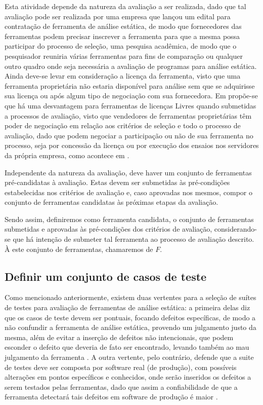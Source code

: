 Esta atividade depende da natureza da avaliação a ser realizada, dado que tal avaliação pode ser realizada por uma empresa que lançou um edital para contratação de ferramenta de análise estática, de modo que fornecedores das ferramentas podem precisar inscrever a ferramenta para que a mesma possa participar do processo de seleção, uma pesquisa acadêmica, de modo que o pesquisador reuniria várias ferramentas para fins de comparação ou qualquer outro quadro onde seja necessária a avaliação de programas para análise estática. Ainda deve-se levar em consideração a licença da ferramenta, visto que uma ferramenta proprietária não estaria disponível para análise sem que se adquirisse sua licença ou após algum tipo de negociação com sua fornecedora. Em \cite{pascal} propõe-se que há uma desvantagem para ferramentas de licenças Livres quando submetidas a processos de avaliação, visto que vendedores de ferramentas proprietárias têm poder de negociação em relação aos critérios de seleção e todo o processo de avaliação, dado que podem negociar a participação ou não de sua ferramenta no processo, seja por concessão da licença ou por execução dos ensaios nos servidores da própria empresa, como acontece em \cite{sate_iv}.

Independente da natureza da avaliação, deve haver um conjunto de ferramentas pré-candidatas à avaliação. Estas devem ser submetidas às pré-condições estabelecidas nos critérios de avaliação e, caso aprovadas nos mesmos, compor o conjunto de ferramentas candidatas às próximas etapas da avaliação.

Sendo assim, definiremos como ferramenta candidata, o conjunto de ferramentas submetidas e aprovadas às pré-condições dos critérios de avaliação, considerando-se que há intenção de submeter tal ferramenta ao processo de avaliação descrito. À este conjunto de ferramentas, chamaremos de $F$.

\subsection{Definir um conjunto de casos de teste}

Como mencionado anteriormente, existem duas vertentes para a seleção de suítes de testes para avaliação de ferramentas de análise estática: a primeira delas diz que os casos de teste devem ser pontuais, focando defeitos específicas, de modo a não confundir a ferramenta de análise estática, provendo um julgamento justo da mesma, além de  evitar a inserção de defeitos não intencionais, que podem esconder o defeito que deveria de fato ser encontrado, levando também ao mau julgamento da ferramenta \cite{pascal}. A outra vertente, pelo contrário, defende que a suite de testes deve ser composta por software real (de produção), com possíveis alterações em pontos específicos e conhecidos,  onde serão inseridos os defeitos a serem testados  pelas ferramentas, dado que assim a confiabilidade de que a ferramenta detectará tais defeitos em software de produção  é maior \cite{harvard}.

